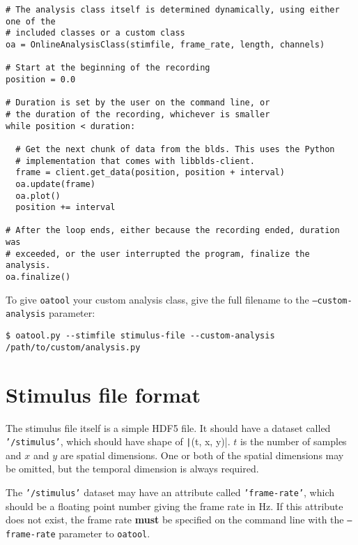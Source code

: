 \documentclass[12pt]{article}
\begin{document}
\begin{verbatim}
# The analysis class itself is determined dynamically, using either one of the
# included classes or a custom class
oa = OnlineAnalysisClass(stimfile, frame_rate, length, channels)

# Start at the beginning of the recording
position = 0.0

# Duration is set by the user on the command line, or
# the duration of the recording, whichever is smaller
while position < duration:

  # Get the next chunk of data from the blds. This uses the Python
  # implementation that comes with libblds-client.
  frame = client.get_data(position, position + interval)
  oa.update(frame)
  oa.plot()
  position += interval

# After the loop ends, either because the recording ended, duration was
# exceeded, or the user interrupted the program, finalize the analysis.
oa.finalize()
\end{verbatim}

To give \texttt{oatool} your custom analysis class, give the full filename to
the \texttt{--custom-analysis} parameter:

\begin{verbatim}
$ oatool.py --stimfile stimulus-file --custom-analysis /path/to/custom/analysis.py
\end{verbatim}

\section*{Stimulus file format}

The stimulus file itself is a simple HDF5 file. It should have a dataset called
\texttt{'/stimulus'}, which should have shape of \texttt|(t, x, y)|.
$t$ is the number of samples and $x$ and $y$ are spatial dimensions. One or both
of the spatial dimensions may be omitted, but the temporal dimension is always
required.

The \texttt{'/stimulus'} dataset may have an attribute called \texttt{'frame-rate'},
which should be a floating point number giving the frame rate in Hz. If this attribute
does not exist, the frame rate \textbf{must} be specified on the command line with the
\texttt{--frame-rate} parameter to \texttt{oatool}.
\end{document}
